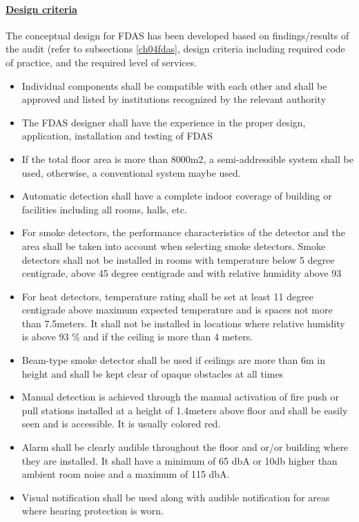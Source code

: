 \paragraph{\underline{Design criteria}}
The conceptual design for FDAS has been developed based on findings/results of the audit (refer to subsections \ref{ch04fdas}, design criteria including required code of practice, and the required level of services.
\begin{itemize}
\item Individual components shall be compatible with each other and shall be approved and listed by institutions recognized by the relevant authority
\item The FDAS designer shall have the experience in the proper design, application, installation and testing of FDAS
\item If the total floor area is more than 8000m2, a semi-addressible system shall be used, otherwise, a conventional system maybe used.
\item  Automatic detection shall have a complete indoor coverage of building or facilities including all rooms, halls, etc.
\item  For smoke detectors, the performance characteristics of the detector and the area shall be taken into account when selecting smoke detectors. Smoke detectors shall not be installed in rooms with temperature below 5 degree centigrade, above 45 degree centigrade and with relative humidity above 93%
\item  For heat detectors, temperature rating shall be set at least 11 degree centigrade above maximum expected temperature and is spaces not more than 7.5meters. It shall not be installed in locations where relative humidity is above 93 \% and if the ceiling is more than 4 meters.
\item  Beam-type smoke detector shall be used if ceilings are more than 6m in height and shall be kept clear of opaque obstacles at all times
\item  Manual detection is achieved through the manual activation of fire push or pull stations installed at a height of 1.4meters above floor and shall be easily seen and is accessible. It is usually colored red.
\item  Alarm shall be clearly audible throughout the floor and or/or building where they are installed. It shall have a minimum of 65 dbA or 10db higher than ambient room noise and a maximum of 115 dbA. 
\item  Visual notification shall be used along with audible notification for areas where hearing protection is worn.
\end{itemize}

